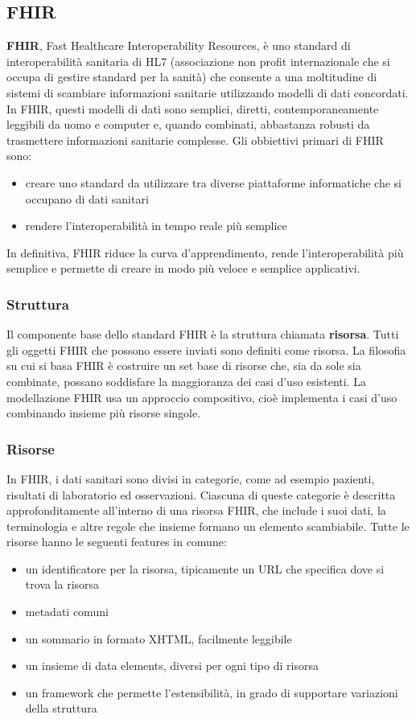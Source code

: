 \documentclass[a4paper]{article}
\begin{document}
\subsection{FHIR}\label{subsec: FHIR}
\textbf{FHIR}, Fast Healthcare Interoperability Resources, è uno standard di interoperabilità sanitaria di HL7 (associazione non profit internazionale che si occupa di gestire standard per la sanità)
che consente a una moltitudine di sistemi di scambiare informazioni sanitarie utilizzando modelli di dati concordati. In FHIR, questi modelli di dati sono semplici, diretti, contemporaneamente
leggibili da uomo e computer e, quando combinati, abbastanza robusti da trasmettere informazioni sanitarie complesse.
Gli obbiettivi primari di FHIR sono:
\begin{itemize}
    \item creare uno standard da utilizzare tra diverse piattaforme informatiche che si occupano di dati sanitari
    \item rendere l'interoperabilità in tempo reale più semplice
\end{itemize}
In definitiva, FHIR riduce la curva d'apprendimento, rende l'interoperabilità più semplice e permette di creare in modo più veloce e semplice applicativi.

\subsubsection{Struttura}
Il componente base dello standard FHIR è la struttura chiamata \textbf{risorsa}. Tutti gli oggetti FHIR che possono essere inviati sono definiti come risorsa.
La filosofia su cui si basa FHIR è costruire un set base di risorse che, sia da sole sia combinate, possano soddisfare la maggioranza dei casi d'uso esistenti.
La modellazione FHIR usa un approccio compositivo, cioè implementa i casi d'uso combinando insieme più risorse singole.

\subsubsection*{Risorse}
In FHIR, i dati sanitari sono divisi in categorie, come ad esempio pazienti, risultati di laboratorio ed osservazioni.
Ciascuna di queste categorie è descritta approfonditamente all'interno di una risorsa FHIR, che include i suoi dati, la terminologia e altre regole che insieme formano un elemento scambiabile.
Tutte le risorse hanno le seguenti features in comune:
\begin{itemize}
    \item un identificatore per la risorsa, tipicamente un URL che specifica dove si trova la risorsa
    \item metadati comuni
    \item un sommario in formato XHTML, facilmente leggibile
    \item un insieme di data elements, diversi per ogni tipo di risorsa
    \item un framework che permette l'estensibilità, in grado di supportare variazioni della struttura
\end{itemize}
\end{document}
